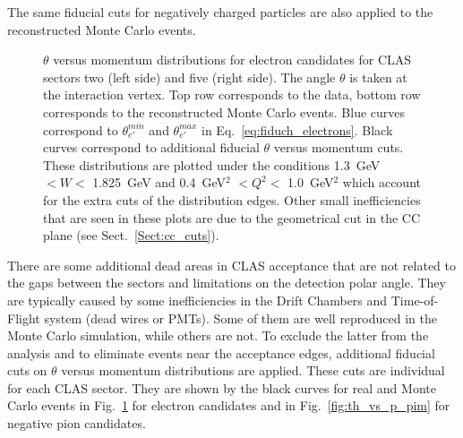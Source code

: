 The same fiducial cuts for negatively charged particles are also applied to the reconstructed Monte Carlo events.
\clearpage

\begin{figure}[htp]
\begin{center}
\caption{\small  $\theta$ versus momentum distributions for electron candidates for CLAS sectors two (left side) and five (right side). The angle $\theta$ is taken at the interaction vertex. Top row corresponds to the data, bottom row corresponds to the reconstructed Monte Carlo events. Blue curves correspond to $\theta_{e'}^{min}$ and $\theta_{e'}^{max}$ in Eq.~\eqref{eq:fiduch_electrons}. Black curves correspond to additional fiducial $\theta$ versus momentum cuts. These distributions are plotted under the conditions 1.3~GeV $< W <$ 1.825~GeV and 0.4~GeV$^{2}$ $< Q^{2} <$ 1.0~GeV$^{2}$ which account for the extra cuts of the distribution edges. Other small inefficiencies that are seen in these plots are due to the geometrical cut in the CC plane (see Sect.~\ref{Sect:cc_cuts}). \label{fig:th_vs_p_el}}
\end{center}
\end{figure}

There are some additional dead areas in CLAS acceptance that are not related to the gaps between the sectors and limitations on the detection polar angle. They are typically caused by some inefficiencies in the Drift Chambers and Time-of-Flight system (dead wires or PMTs). Some of them are well reproduced in the Monte Carlo simulation, while others are not. To exclude the latter from the analysis and to eliminate events near the acceptance edges, additional fiducial cuts on $\theta$ versus momentum distributions are applied. These cuts are individual for each CLAS sector. They are shown by the black curves for real and Monte Carlo events in Fig.~\ref{fig:th_vs_p_el} for electron candidates and in Fig.~\ref{fig:th_vs_p_pim} for negative pion candidates. 

